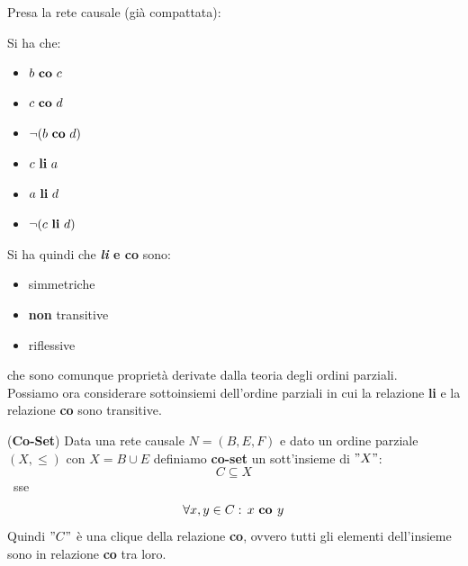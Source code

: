 \begin{esempio}
  Presa la rete causale (già compattata):
  \begin{figure}[H]
    \centering
  \end{figure}
  Si ha che:
  \begin{itemize}
    \item $b \mbox{ \textbf{co} }c$
    \item $c \mbox{ \textbf{co} }d$
    \item $\neg (b \mbox{ \textbf{co} }d)$
    \item $c \mbox{ \textbf{li} }a$
    \item $a \mbox{ \textbf{li} }d$
    \item $\neg (c \mbox{ \textbf{li} }d)$
  \end{itemize}
\end{esempio}
Si ha quindi che \textbf{\textit{li} \textnormal{e} co} sono:
\begin{itemize}
  \item simmetriche
  \item \textbf{non} transitive
  \item riflessive
\end{itemize}
che sono comunque proprietà derivate dalla teoria degli ordini parziali.\\
Possiamo ora considerare sottoinsiemi dell'ordine parziali in cui la relazione
\textbf{li} e la relazione \textbf{co} sono transitive.
\begin{definizione}(\textbf{Co-Set})
  Data una rete causale $N=(B, E, F)$ e dato un ordine parziale $(X, \leq)$ con
  $X=B\cup E$ definiamo \textbf{co-set} un sott'insieme di $"X"$:
  \[C\subseteq X\]\mbox{ sse} \[\forall x, y\in C:\, x\mbox{ \textbf{co }}y\]
    Quindi $"C"$ è una clique della relazione \textbf{co}, ovvero tutti gli elementi dell'insieme sono in relazione \textbf{co} tra loro.
\end{definizione} \vspace{5mm} %
